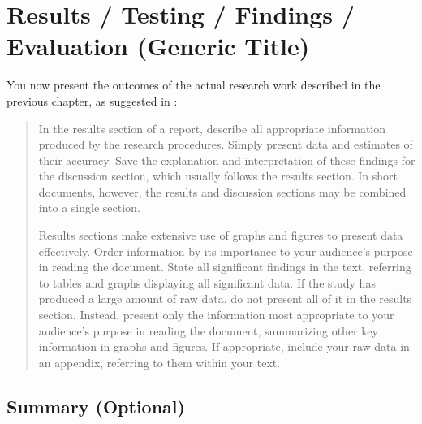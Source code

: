 \cleardoublepage
\chapter{Results / Testing / Findings / Evaluation (Generic Title)}
\label{chap:evaluation} 

You now present the outcomes of the actual research work described in the previous chapter, as suggested in \cite{perelman97mht}:


\begin{quotation}
In the results section of a report, describe all appropriate information produced by the research procedures. Simply present data and estimates of their accuracy. Save the explanation and interpretation of these findings for the discussion section, which usually follows the results section. In short documents, however, the results and discussion sections may be combined into a single section.

Results sections make extensive use of graphs and figures to present data effectively. Order information by its importance to your audience's purpose in reading the document. State all significant findings in the text, referring to tables and graphs displaying all significant data. If the study has produced a large amount of raw data, do not present all of it in the results section. Instead, present only the information most appropriate to your audience's purpose in reading the document, summarizing other key information in graphs and figures. If appropriate, include your raw data in an appendix, referring to them within your text.
\end{quotation}


\lipsum[52-60]

\section{Summary (Optional)}



